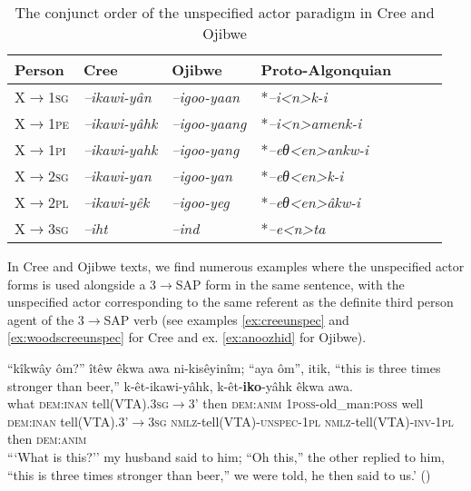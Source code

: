 \documentclass[twoside,a4paper,11pt]{article}
\newcommand{\ipa}[1]{{\phon\textit{#1}}}
\newcommand{\sg}{\textsc{sg}}
\newcommand{\pl}{\textsc{pl}}
\newcommand{\grise}[1]{\cellcolor{lightgray}\textbf{#1}}
\newcommand{\anim}{\textsc{anim}}
\newcommand{\dem}{\textsc{dem}}
\newcommand{\inan}{\textsc{inan}}
\newcommand{\inv}{\textsc{inv}}
\newcommand{\nmlz}{\textsc{nmlz}}
\newcommand{\pli}{\textsc{pi}}
\newcommand{\pe}{\textsc{pe}}
\newcommand{\poss}{\textsc{poss}}
\newcommand{\unspec}{\textsc{unspec}}
\begin{document}
\begin{table}[htbp]
\caption{The conjunct order of the unspecified actor paradigm in Cree and Ojibwe} \label{tab:unspec} \centering
\begin{tabular}{lllllll}
\toprule
Person &   Cree & Ojibwe      &Proto-Algonquian\\
\midrule
X$\rightarrow$1\sg& \ipa{--ikawi-yân} \grise{} &\ipa{--igoo-yaan} \grise{}  & *\ipa{--i<n>k-i} \\
X$\rightarrow$1\pe & \ipa{--ikawi-yâhk} \grise{}   &\ipa{--igoo-yaang} \grise{}  & *\ipa{--i<n>amenk-i} \\
X$\rightarrow$1\pli & \ipa{--ikawi-yahk} \grise{}  &\ipa{--igoo-yang} \grise{}  & *\ipa{--eθ<en>ankw-i} \\
\midrule
X$\rightarrow$2\sg& \ipa{--ikawi-yan} \grise{} &\ipa{--igoo-yan} \grise{}  & *\ipa{--eθ<en>k-i} \\
X$\rightarrow$2\pl& \ipa{--ikawi-yêk} \grise{} &\ipa{--igoo-yeg} \grise{}  & *\ipa{--eθ<en>âkw-i}  \\
\midrule
X$\rightarrow$3\sg& \ipa{--iht}   &\ipa{--ind}  & *\ipa{--e<n>ta} \\
\bottomrule
\end{tabular}
\end{table}

In Cree and Ojibwe texts, we find numerous examples where the unspecified actor forms is used alongside a 3$\rightarrow$SAP form in the same sentence, with the unspecified actor corresponding to the same referent as  the definite third person agent of the 3$\rightarrow$SAP verb (see examples \ref{ex:creeunspec} and \ref{ex:woodscreeunspec} for Cree and ex. \ref{ex:anoozhid} for Ojibwe).


\begin{exe}
 \ex \label{ex:creeunspec}
\gll ``kîkwây ôm?'' îtêw êkwa awa ni-kisêyinîm; ``aya ôm'', itik, {\rm``this is three times stronger than beer,''} k-êt-ikawi-yâhk, k-êt-\textbf{iko}-yâhk êkwa awa.\\
what {\dem{:}\inan} {tell(VTA).3\sg$\rightarrow$3'} then {\dem{:}\anim} {1\poss-old\_man{:}\poss} well {\dem{:}\inan} {tell(VTA).3'$\rightarrow$3\sg} {} {\nmlz-tell(VTA)-\unspec-1\pl} {\nmlz-tell(VTA)-\inv-1\pl} then {\dem{:}\anim}\\
\glt ```What is this?'' my husband said to him; ``Oh this,'' the other replied to him, ``this is three times stronger than beer,'' we were told, he then said to us.' (\citealp[p. 57]{bothsides})
\end{exe}
\end{document}
